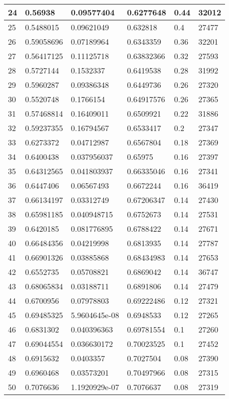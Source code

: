 \begin{longtable}{|l|l|l|l|l|l|}
24 & 0.56938 & 0.09577404 & 0.6277648 & 0.44 & 32012 \\ \hline 
25 & 0.5488015 & 0.09621049 & 0.632818 & 0.4 & 27477 \\ \hline 
26 & 0.59058696 & 0.07189964 & 0.6343359 & 0.36 & 32201 \\ \hline 
27 & 0.56417125 & 0.11125718 & 0.63832366 & 0.32 & 27593 \\ \hline 
28 & 0.5727144 & 0.1532337 & 0.6419538 & 0.28 & 31992 \\ \hline 
29 & 0.5960287 & 0.09386348 & 0.6449736 & 0.26 & 27320 \\ \hline 
30 & 0.5520748 & 0.1766154 & 0.64917576 & 0.26 & 27365 \\ \hline 
31 & 0.57468814 & 0.16409011 & 0.6509921 & 0.22 & 31886 \\ \hline 
32 & 0.59237355 & 0.16794567 & 0.6533417 & 0.2 & 27347 \\ \hline 
33 & 0.6273372 & 0.04712987 & 0.6567804 & 0.18 & 27369 \\ \hline 
34 & 0.6400438 & 0.037956037 & 0.65975 & 0.16 & 27397 \\ \hline 
35 & 0.64312565 & 0.041803937 & 0.66335046 & 0.16 & 27341 \\ \hline 
36 & 0.6447406 & 0.06567493 & 0.6672244 & 0.16 & 36419 \\ \hline 
37 & 0.66134197 & 0.03312749 & 0.67206347 & 0.14 & 27430 \\ \hline 
38 & 0.65981185 & 0.040948715 & 0.6752673 & 0.14 & 27531 \\ \hline 
39 & 0.6420185 & 0.081776895 & 0.6788422 & 0.14 & 27671 \\ \hline 
40 & 0.66484356 & 0.04219998 & 0.6813935 & 0.14 & 27787 \\ \hline 
41 & 0.66901326 & 0.03885868 & 0.68434983 & 0.14 & 27653 \\ \hline 
42 & 0.6552735 & 0.05708821 & 0.6869042 & 0.14 & 36747 \\ \hline 
43 & 0.68065834 & 0.03188711 & 0.6891806 & 0.14 & 27479 \\ \hline 
44 & 0.6700956 & 0.07978803 & 0.69222486 & 0.12 & 27321 \\ \hline 
45 & 0.69485325 & 5.9604645e-08 & 0.6948533 & 0.12 & 27265 \\ \hline 
46 & 0.6831302 & 0.040396363 & 0.69781554 & 0.1 & 27260 \\ \hline 
47 & 0.69044554 & 0.036630172 & 0.70023525 & 0.1 & 27452 \\ \hline 
48 & 0.6915632 & 0.0403357 & 0.7027504 & 0.08 & 27390 \\ \hline 
49 & 0.6960468 & 0.03573201 & 0.70497966 & 0.08 & 27315 \\ \hline 
50 & 0.7076636 & 1.1920929e-07 & 0.7076637 & 0.08 & 27319 \\ \hline 
\end{longtable}